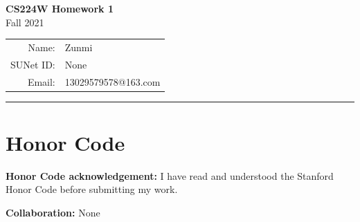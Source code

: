 \documentclass[11pt]{article}
\makeatletter
\newcommand{\studentname}{Zunmi}
\newcommand{\studentid}{None}
\newcommand{\studentemail}{13029579578@163.com}
\newcommand{\collaborators}{None}
\makeatother
\begin{document}
\begin{center}
  {\Large\bfseries CS224W Homework 1}\\[0.5em]
  {\large Fall 2021}\\[1em]
  \begin{tabular}{rl}
    Name: & \studentname \\
    SUNet ID: & \studentid \\
    Email: & \studentemail
  \end{tabular}
\end{center}

\vspace{0.75em}
\hrule
\vspace{1em}







\clearpage
\section*{Honor Code}

\noindent
\textbf{Honor Code acknowledgement:}
I have read and understood the Stanford Honor Code before submitting my work.

\noindent
\textbf{Collaboration:} \collaborators
\end{document}
